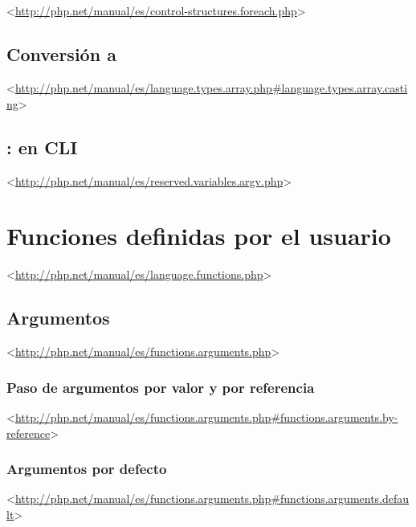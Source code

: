 \documentclass[a4paper,11pt,spanish]{sphinxmanual}
\begin{document}
\subsection{}
\label{\detokenize{php:foreach}}
\textless{}\url{http://php.net/manual/es/control-structures.foreach.php}\textgreater{}


\subsection{Conversión a }
\label{\detokenize{php:conversion-a-array}}
\textless{}\url{http://php.net/manual/es/language.types.array.php\#language.types.array.casting}\textgreater{}


\subsection{:  en CLI}
\label{\detokenize{php:ejemplo-argv-en-cli}}
\textless{}\url{http://php.net/manual/es/reserved.variables.argv.php}\textgreater{}


\section{Funciones definidas por el usuario}
\label{\detokenize{php:funciones-definidas-por-el-usuario}}
\textless{}\url{http://php.net/manual/es/language.functions.php}\textgreater{}


\subsection{Argumentos}
\label{\detokenize{php:argumentos}}
\textless{}\url{http://php.net/manual/es/functions.arguments.php}\textgreater{}


\subsubsection{Paso de argumentos por valor y por referencia}
\label{\detokenize{php:paso-de-argumentos-por-valor-y-por-referencia}}
\textless{}\url{http://php.net/manual/es/functions.arguments.php\#functions.arguments.by-reference}\textgreater{}


\subsubsection{Argumentos por defecto}
\label{\detokenize{php:argumentos-por-defecto}}
\textless{}\url{http://php.net/manual/es/functions.arguments.php\#functions.arguments.default}\textgreater{}
\end{document}
